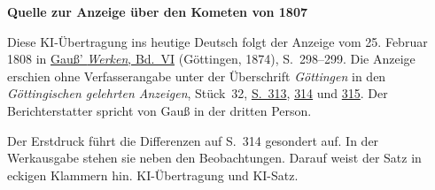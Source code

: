 \clearpage\thispagestyle{empty}
\begin{center}\textbf{Quelle zur Anzeige über den Kometen von 1807}\end{center}
\noindent Diese KI-Übertragung ins heutige Deutsch folgt der Anzeige vom 25. Februar 1808 in \href{https://gdz.sub.uni-goettingen.de/id/PPN236007467}{Gauß’ \textit{Werken}, Bd.~VI} (Göttingen, 1874), S.~298--299. Die Anzeige erschien ohne Verfasserangabe unter der Überschrift \textit{Göttingen} in den \textit{Göttingischen gelehrten Anzeigen}, Stück~32, \href{https://manifests.sub.uni-goettingen.de/iiif/image/gdz:PPN319721507_1808:00000317/full/1600,/0/default.jpg}{S.~313}, \href{https://manifests.sub.uni-goettingen.de/iiif/image/gdz:PPN319721507_1808:00000318/full/1600,/0/default.jpg}{314} und \href{https://manifests.sub.uni-goettingen.de/iiif/image/gdz:PPN319721507_1808:00000319/full/1600,/0/default.jpg}{315}. Der Berichterstatter spricht von Gauß in der dritten Person.
\par\medskip
Der Erstdruck führt die Differenzen auf S.~314 gesondert auf. In der Werkausgabe stehen sie neben den Beobachtungen. Darauf weist der Satz in eckigen Klammern hin. KI-Übertragung und KI-Satz.
\clearpage
